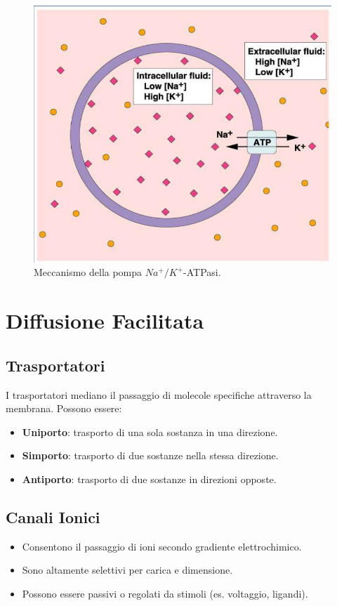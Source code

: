 \documentclass{article}
\begin{document}
\begin{figure}[h]
    \centering
    \includegraphics[width=1\textwidth]{Neuroscienze 2024-2025/Modulo I/Immagini Modulo I/Screenshot 2025-06-21 at 16-23-00 4. Gradiente elettrochimico_Diffusione facilitata_trasporti.pdf.png}
    \caption{Meccanismo della pompa \(Na^+/K^+\)-ATPasi.}
    \label{fig:pompa}
\end{figure}

\section{Diffusione Facilitata}
\subsection{Trasportatori}
I trasportatori mediano il passaggio di molecole specifiche attraverso la membrana. Possono essere:
\begin{itemize}
    \item \textbf{Uniporto}: trasporto di una sola sostanza in una direzione.
    \item \textbf{Simporto}: trasporto di due sostanze nella stessa direzione.
    \item \textbf{Antiporto}: trasporto di due sostanze in direzioni opposte.
\end{itemize}

\subsection{Canali Ionici}
\begin{itemize}
    \item Consentono il passaggio di ioni secondo gradiente elettrochimico.
    \item Sono altamente selettivi per carica e dimensione.
    \item Possono essere passivi o regolati da stimoli (es. voltaggio, ligandi).
\end{itemize}
\end{document}
